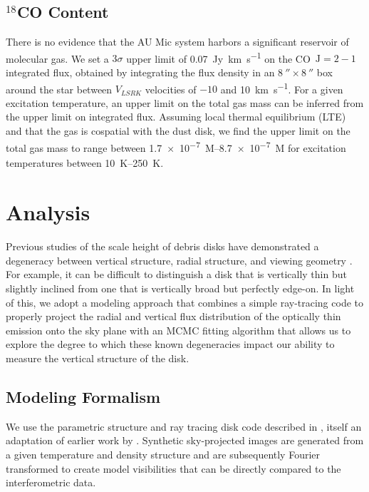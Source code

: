 \documentclass[modern]{aastex62}
\begin{document}
\subsection{$^{18}$CO Content}
\label{subsection: gas}

There is no evidence that the AU Mic system harbors a significant reservoir of molecular gas.
We set a $3 \sigma$ upper limit of \SI{0.07}{Jy.km.s^{-1}} on the CO~$\mathrm{J}=2-1$ integrated flux, obtained by integrating the flux density in an $\SI{8}{\arcsecond} \times \SI{8}{\arcsecond}$ box around the star between $V_{LSRK}$ velocities of $-10$ and \SI{10}{km.s^{-1}}.
For a given excitation temperature, an upper limit on the total gas mass can be inferred from the upper limit on integrated flux.
Assuming local thermal equilibrium (LTE) and that the gas is cospatial with the dust disk, we find the upper limit on the total gas mass to range between \SIrange[range-phrase=\ and\ ]{1.7e-7}{8.7e-7}{M_\earth} for excitation temperatures between \SIrange[range-phrase=\ and\ ]{10}{250}{K}.



\section{Analysis}
\label{section: analysis}
Previous studies of the scale height of debris disks have demonstrated a degeneracy between vertical structure, radial structure, and viewing geometry \citep[e.g.,][]{milli14}.  
For example, it can be difficult to distinguish a disk that is vertically thin but slightly inclined from one that is vertically broad but perfectly edge-on.
In light of this, we adopt a modeling approach that combines a simple ray-tracing code to properly project the radial and vertical flux distribution of the optically thin emission onto the sky plane with an MCMC fitting algorithm that allows us to explore the degree to which these known degeneracies impact our ability to measure the vertical structure of the disk.  

\subsection{Modeling Formalism}

We use the parametric structure and ray tracing disk code described in \cite{flaherty15}, itself an adaptation of earlier work by \cite{rosenfeld13}.
Synthetic sky-projected images are generated from a given temperature and density structure and are subsequently Fourier transformed to create model visibilities that can be directly compared to the interferometric data.
\end{document}
